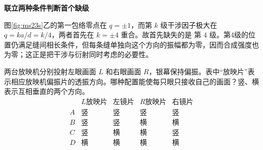 \begin{solution}
\par\medskip{}\noindent\textbf{联立两种条件判断首个缺级}\par\nobreak
图\ref{fig:ms23s}乙的第一包络零点在 \(q=\pm1\)，而第 \(k\) 级干涉因子极大在 \(q=ka/d=k/4\)，两者首先在 \(k=\pm4\) 重合。故首先缺失的是 \(\boxed{\text{第 }4\text{ 级}}\)。第4级的位置仍满足缝间相长条件，但每条缝单独向这个方向的振幅都为零，因而合成强度也为零；这正是把干涉与衍射同时考虑的必要性。
\end{solution}

\begin{question}
\begin{example}[立体电影的偏振配置]\label{ex:m27}
两台放映机分别投射左眼画面 \(L\) 和右眼画面 \(R\)，银幕保持偏振。表中“放映片”表示相应放映机偏振片的透振方向。哪种配置能使每只眼只接收自己的画面？竖、横表示互相垂直的两个方向。
\[
\begin{array}{c|cccc}
 &L\text{放映片}&\text{左镜片}&R\text{放映片}&\text{右镜片}\\\hline
 A&\text{竖}&\text{竖}&\text{竖}&\text{竖}\\
 B&\text{竖}&\text{竖}&\text{横}&\text{横}\\
 C&\text{竖}&\text{横}&\text{横}&\text{竖}\\
 D&\text{横}&\text{横}&\text{横}&\text{横}
\end{array}
\]
\end{example}
\end{question}

